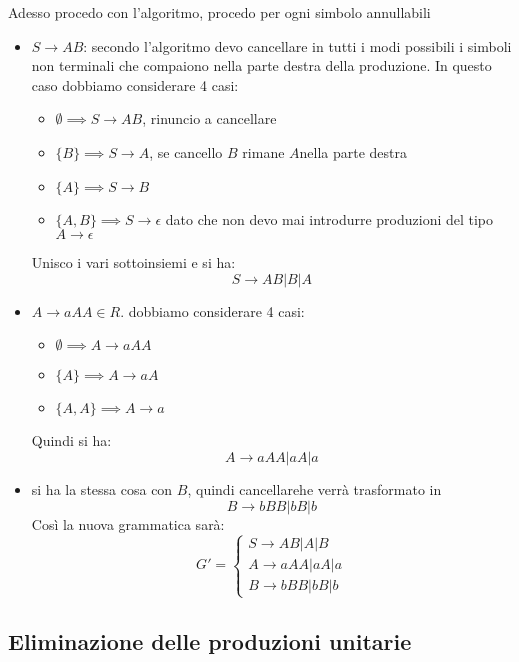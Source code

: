 {    Adesso procedo con l'algoritmo, procedo per ogni simbolo annullabili
    \begin{itemize}
        \item $S\to AB$: secondo l'algoritmo devo cancellare in tutti i modi possibili i simboli non terminali che compaiono nella parte destra della produzione. In questo caso dobbiamo considerare 4 casi:
        \begin{itemize}
            \item $\emptyset\implies S\to AB$, rinuncio a cancellare
            \item $\{B\}\implies S\to A$, se cancello $B$ rimane $A $nella parte destra
            \item $\{A\}\implies S\to B$
            \item $\{A,B\}\implies S\to \epsilon$ dato che non devo mai introdurre produzioni del tipo \( A \rightarrow \epsilon \) 
        \end{itemize}
        Unisco i vari sottoinsiemi e si ha:
        \[
            S\to AB|B|A
        \]
        \item $A\to aAA\in R$. dobbiamo considerare 4 casi:
        \begin{itemize}
            \item $\emptyset\implies A\to aAA$
            \item $\{A\}\implies A\to aA$
            \item $\{A,A\}\implies A\to a$
        \end{itemize}
        Quindi si ha:
        \[
            A\to aAA|aA|a    
        \]
        \item si ha la stessa cosa con $B$, quindi cancellarehe verrà trasformato in 
        \[
            B\to bBB|bB|b    
        \]
        Così la nuova grammatica sarà:
        \[
            G' = \begin{cases}
                S\to AB|A|B\\
                A\to aAA|aA|a\\
                B\to bBB|bB|b
            \end{cases}    
        \]
    \end{itemize}
}
\subsection{Eliminazione delle produzioni unitarie}



